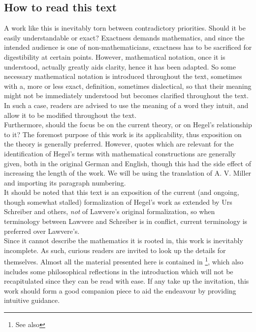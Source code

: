 \documentclass{article}
\begin{document}
\subsection{How to read this text}
A work like this is inevitably torn between contradictory priorities. Should it be easily understandable
or exact? Exactness demands mathematics, and since the intended audience is one of non-mathematicians,
exactness has to be sacrificed for digestibility at certain points. However, mathematical notation, once
it is understood, actually greatly aids clarity, hence it has been adapted. So some necessary mathematical
notation is introduced throughout the text, sometimes with a, more or less exact, definition, sometimes
dialectical, so that their meaning might not be immediately understood but becomes clarified throughout
the text. In such a case, readers are advised to use the meaning of a word they intuit, and allow it to
be modified throughout the text. \\

Furthermore, should the focus be on the current theory, or on Hegel's relationship to it? The foremost
purpose of this work is its applicability, thus exposition on the theory is generally preferred. However,
quotes which are relevant for the identification of Hegel's terms with mathematical constructions are
generally given, both in the original German and English, though this had the side effect of increasing
the length of the work. We will be using the translation of A. V. Miller and importing its paragraph numbering.
\\

It should be noted that this text is an exposition of the current (and ongoing, though somewhat stalled)
formalization of Hegel's work as extended by Urs Schreiber and others, \emph{not} of Lawvere's original
formalization, so when terminology between Lawvere and Schreiber is in conflict, current terminology is
preferred over Lawvere's. \\

Since it cannot describe the mathematics it is rooted in, this work is inevitably incomplete. As such,
 curious readers are invited to look up the details for themselves. Almost all the material presented
here is contained in \cite{nlabsol}\footnote{See also }, which also includes some philosophical reflections
in the introduction which will not be recapitulated since they can be read with ease. If any take up the
invitation, this work should form a good companion piece to aid the endeavour by providing intuitive guidance.
\end{document}
